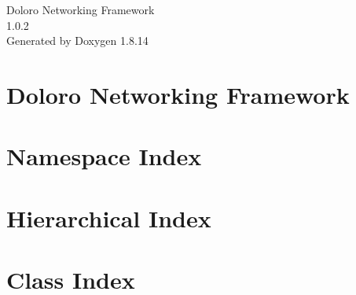 \documentclass[twoside]{book}
\newcommand{\+}{\discretionary{\mbox{\scriptsize$\hookleftarrow$}}{}{}}
\newcommand{\clearemptydoublepage}{%
  \newpage{\pagestyle{empty}\cleardoublepage}%
}
\begin{document}
\hypersetup{pageanchor=false,
             bookmarksnumbered=true,
             pdfencoding=unicode
            }
\begin{titlepage}
\vspace*{7cm}
\begin{center}%
{\Large Doloro Networking Framework \\[1ex]\large 1.\+0.\+2 }\\
\vspace*{1cm}
{\large Generated by Doxygen 1.8.14}\\
\end{center}
\end{titlepage}
\clearemptydoublepage
{}
\tableofcontents
\clearemptydoublepage
{}
\hypersetup{pageanchor=true}

\chapter{Doloro Networking Framework}
\label{md__d_1__work__git_hub_doloro-networking-framework__r_e_a_d_m_e}

\chapter{Namespace Index}

\chapter{Hierarchical Index}

\chapter{Class Index}

\end{document}
